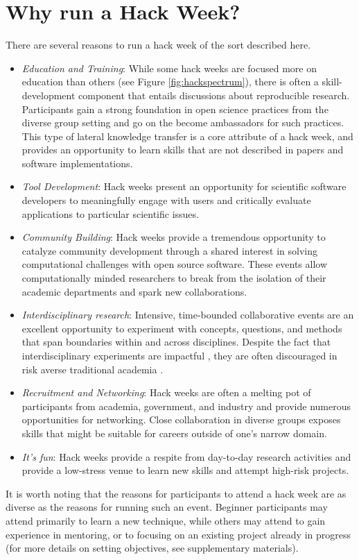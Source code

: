 \section*{Why run a Hack Week?}

There are several reasons to run a hack week of the sort described here.

\begin{itemize}
\item{\textit{Education and Training}:
While some hack weeks are focused more on education than others (see Figure \ref{fig:hackspectrum}), there is often a skill-development component that entails discussions about reproducible research. Participants gain a strong foundation in open science practices from the diverse group setting and go on the become ambassadors for such practices. This type of lateral knowledge transfer is a core attribute of a hack week, and provides an opportunity to learn skills that are not described in papers and software implementations.}

\item{\textit{Tool Development}: Hack weeks present an opportunity for scientific software developers to meaningfully engage with users and critically evaluate applications to particular scientific issues.}

\item{\textit{Community Building}: Hack weeks provide a tremendous opportunity to catalyze community development through a shared interest in solving computational challenges with open source software. These events allow computationally minded researchers to break from the isolation of their academic departments and spark new collaborations.}


\item{\textit{Interdisciplinary research}: Intensive, time-bounded collaborative events are an excellent opportunity to experiment with concepts, questions, and methods that span boundaries within and across disciplines. Despite the fact that interdisciplinary experiments are impactful \cite{Hall2012-hi}, they are often discouraged in risk averse traditional academia \cite{Sung2003-go}}.

\item{\textit{Recruitment and Networking}: Hack weeks are often a melting pot of participants from academia, government, and industry and provide numerous opportunities for networking. Close collaboration in diverse groups exposes skills that might be suitable for careers outside of one's narrow domain.}

\item{\textit{It's fun}: Hack weeks provide a respite from day-to-day research activities and provide a low-stress venue to learn new skills and attempt high-risk projects.}

\end{itemize}

\noindent It is worth noting that the reasons for participants to attend a hack week are as diverse as the reasons for running such an event.
Beginner participants may attend primarily to learn a new technique, while others may attend to gain experience in mentoring, or to focusing on an existing project already in progress (for more details on setting objectives, see supplementary materials).

